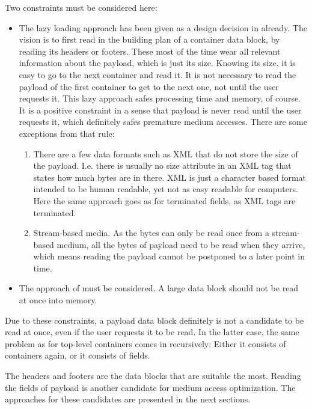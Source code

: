 Two constraints must be considered here:
\begin{itemize}
	\item The lazy loading approach has been given as a design decision in  already. The vision is to first read in the building plan of a container data block, by reading its headers or footers. These most of the time wear all relevant information about the payload, which is just its size. Knowing its size, it is easy to go to the next container and read it. It is not necessary to read the payload of the first container to get to the next one, not until the user requests it. This lazy approach safes processing time and memory, of course. It is a positive constraint in a sense that payload is never read until the user requests it, which definitely safes premature medium accesses. There are some exceptions from that rule: 
\begin{enumerate}
	\item There are a few data formats such as XML that do not store the size of the payload. I.e. there is usually no size attribute in an XML tag that states how much bytes are in there. XML is just a character based format intended to be human readable, yet not as easy readable for computers. Here the same approach goes as for terminated fields, as XML tags are terminated.
	\item Stream-based media. As the bytes can only be read once from a stream-based medium, all the bytes of payload need to be read when they arrive, which means reading the payload cannot be postponed to a later point in time.
\end{enumerate}
	\item The approach of  must be considered. A large data block should not be read at once into memory.
\end{itemize}

Due to these constraints, a payload data block definitely is not a candidate to be read at once, even if the user requests it to be read. In the latter case, the same problem as for top-level containers comes in recursively: Either it consists of containers again, or it consists of fields.

The headers and footers are the data blocks that are suitable the most. Reading the fields of payload is another candidate for medium access optimization. The approaches for these candidates are presented in the next sections.


